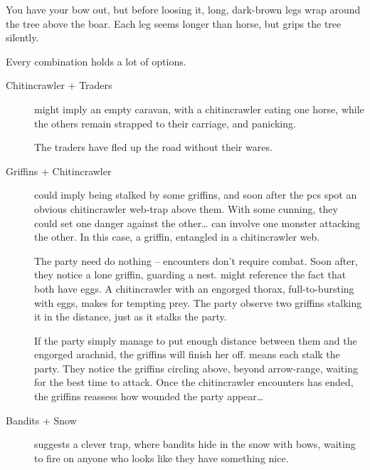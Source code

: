 \begin{multicols}{2}
\begin{speechtext}
  You have your bow out, but before loosing it, long, dark-brown legs wrap around the tree above the boar.
  Each leg seems longer than horse, but grips the tree silently.
\end{speechtext}

Every combination holds a lot of options.

\begin{description}
  \item[Chitincrawler + Traders]
  might imply an empty caravan, with a chitincrawler eating one horse, while the others remain strapped to their carriage, and panicking.

  The traders have fled up the road without their wares.
  \item[Griffins + Chitincrawler]
  \ifcase\value{season}\relax\or
  could imply being stalked by some griffins, and soon after the \glspl{pc} spot an obvious chitincrawler web-trap above them.
  With some cunning, they could set one danger against the other\ldots
  \or
  can involve one monster attacking the other.
  In this case, a griffin, entangled in a chitincrawler web.

  The party need do nothing -- encounters don't require combat.
  Soon after, they notice a lone griffin, guarding a nest.
  \or
  might reference the fact that both have eggs.
  A chitincrawler with an engorged thorax, full-to-bursting with eggs, makes for tempting prey.
  The party observe two griffins stalking it in the distance, just as it stalks the party.

  If the party simply manage to put enough distance between them and the engorged arachnid, the griffins will finish her off.
  \else%
  means each stalk the party.
  They notice the griffins circling above, beyond arrow-range, waiting for the best time to attack.
  Once the chitincrawler encounters has ended, the griffins reassess how wounded the party appear\ldots
  \fi
  \item[Bandits + Snow]
  suggests a clever trap, where bandits hide in the snow with bows, waiting to fire on anyone who looks like they have something nice.
\end{description}

\end{multicols}

